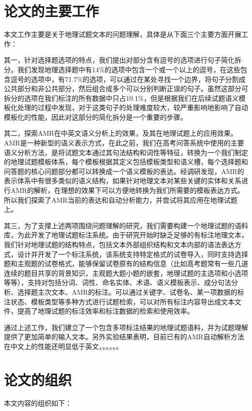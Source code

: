 \documentclass[master, winfont]{njuthesis}
\begin{document}
\section{论文的主要工作}
本文工作主要是关于地理试题文本的问题理解，具体是从下面三个主要方面开展工作：

其一，针对选择题选项的特点，我们提出对部分含有逗号的选项进行句子简化拆分。我们发现地理选择题中有14\%的选项中包含一个或一个以上的逗号，在这些包含逗号的选项中，有71.7\%的选项，可以通过在某处寻找一个边界，将句子分割成公共部分和非公共部分，然后组合成多个可以分别判断正误的句子。虽然这部分可拆分的选项在我们标注的所有数据中只占10.1\%，但是根据我们在后续试题语义模板化处理的过程中发现，对于这类句子的处理难度较大，较严重影响地影响了自动模板化的性能，因此对这部分的简化拆分是一个重要的步骤。

其二，探索AMR在中英文语义分析上的效果，及其在地理试题上的应用效果。AMR是一种新型的语义表示方式，在此之前，我们在高考问答系统中使用的主要语义分析方法，是将试题文本通过其句法结构和词性等特征，转换为一个我们制定的地理试题模板体系，每个模板根据其定义包括模板类型和语义槽，每个选择题和问答题的核心问题部分都可以转换成一个语义模板的表达。经调研发现，AMR的表示体系中有很多类似的语义结构，如果针对地理文本对某些关键的实体和关系进行AMR的解析，在理想的效果下可以方便地转换为我们所需要的模板表达方式。所以我们探索了AMR当前的表达和自动分析能力，并尝试将其应用在地理试题上。

其三，为了支撑上述两项围绕问题理解的研究，我们需要构建一个地理试题的语料库，为此开发了地理试题标注系统。由于研究开始时缺乏足够的有标注地理文本，我们针对地理试题的结构特点，包括文本外部组织结构和文本内部的语法表达方式，设计并开发了一个标注系统，该系统支持特定格式的试卷导入，同时支持选择题和主观题的试卷格式，能够保留试卷原有的结构信息（比如高考题常有一些几道连续的题目共享的背景知识，主观题大题小题的嵌套，地理试题的主选项和小选项等等），支持对包括分词、词性、命名实体、术语、语义模板表示、成分句法分析、选择题主次文本、AMR的标注。可以通过关键字、试卷名、某一项数据的标注状态、模板类型等多种方式进行试题检索，可以对所有标注内容导出成文本文件，提高了地理试题的标注效率和标注数据的检索和使用效率。

通过上述工作，我们建立了一个包含多项标注结果的地理试题语料，并为试题理解提供了更加简单的输入文本。另外实验结果表明，目前已有的AMR自动解析方法在中文上的性能还明显低于英文，。。。。。

\section{论文的组织}
本文内容的组织如下：
\end{document}
